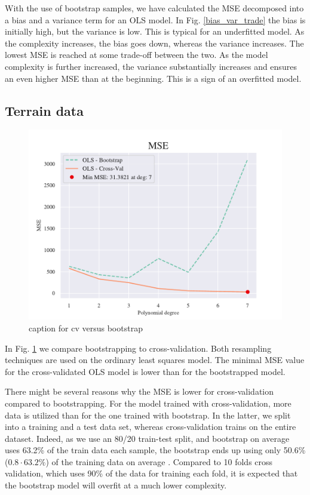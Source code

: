 With the use of bootstrap samples, we have calculated the MSE decomposed into a bias and a variance term for an OLS model. 
In Fig. \ref{bias_var_trade} the bias is initially high, but the variance is low. 
This is typical for an underfitted model. As the complexity increases, the bias goes down, whereas the variance increases. 
The lowest MSE is reached at some trade-off between the two. 
As the model complexity is further increased, the variance substantially increases and ensures an even higher MSE than at the beginning. 
This is a sign of an overfitted model.

\subsection{Terrain data}

\begin{figure}[h!]
    \centering
    \includegraphics[width=1\linewidth]{project_1/figures/figures_in_report/CV_BS_OLS_terrain.pdf}
    \caption{caption for cv versus bootstrap}
    \label{cv_versus_bs}
\end{figure}

In Fig. \ref{cv_versus_bs} we compare bootstrapping to cross-validation. 
Both resampling techniques are used on the ordinary least squares model. 
The minimal MSE value for the cross-validated OLS model is lower than for the bootstrapped model. 

There might be several reasons why the MSE is lower for cross-validation compared to bootstrapping. 
For the model trained with cross-validation, more data is utilized than for the one trained with bootstrap. 
In the latter, we split into a training and a test data set, whereas cross-validation trains on the entire dataset.
Indeed, as we use an 80/20 train-test split, and bootstrap on average uses 63.2\% of the train data each sample, the bootstrap ends up using only 50.6\% ($0.8\cdot 63.2\%$) of the training data on average \citep[p. 251]{hastie}. 
Compared to 10 folds cross validation, which uses 90\% of the data for training each fold, it is expected that the bootstrap model will overfit at a much lower complexity.
 
